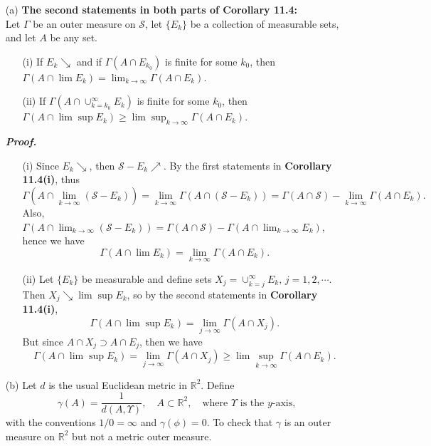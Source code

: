\documentclass[a4paper,11pt]{article}
\begin{document}
	\begin{enumerate}
		\item[(a)]
			\textbf{The second statements in both parts of Corollary 11.4:}\\
			Let $\Gamma$ be an outer measure on $\mathscr{S}$, let $\{E_k\}$ be a collection of measurable sets, and let $A$ be any set.
			\begin{enumerate}
				\item[(i)] If $E_k \searrow$ and if $\Gamma(A \cap E_{k_0})$ is finite for some $k_0$, then $\Gamma(A \cap \lim E_k) = \lim_{k \to \infty} \Gamma(A \cap E_k)$.\

				\item[(ii)] If $\Gamma(A \cap \cup_{k=k_0}^\infty E_k)$ is finite for some $k_0$, then $\Gamma(A \cap \lim \sup E_k) \geq \lim \sup_{k \to \infty} \Gamma(A \cap E_k)$.
			\end{enumerate}
			\textit{\textbf {Proof.}}
			\begin{enumerate}
				\item[(i)]
					Since $E_k \searrow$, then $\mathscr{S} - E_k \nearrow$. By the first statements in \textbf{Corollary 11.4(i)}, thus
						$$\Gamma(A \cap \lim_{k \to \infty} (\mathscr{S} - E_k))
						= \lim_{k \to \infty} \Gamma(A \cap (\mathscr{S} - E_k))
						= \Gamma(A \cap \mathscr{S}) - \lim_{k \to \infty} \Gamma(A \cap E_k).$$
					Also, $\Gamma(A \cap \lim_{k \to \infty} (\mathscr{S} - E_k)) = \Gamma(A \cap \mathscr{S}) - \Gamma(A \cap \lim_{k \to \infty}E_k)$, hence we have
						$$\Gamma(A \cap \lim E_k)
						= \lim_{k \to \infty} \Gamma(A \cap E_k).$$

				\item[(ii)]
					Let $\{E_k\}$ be measurable and define sets $X_j = \cup_{k=j}^\infty E_k,\, j = 1,2,\cdots$. Then $X_j \searrow \lim \sup E_k$, so by the second statements in \textbf{Corollary 11.4(i)},
						$$\Gamma(A \cap \lim \sup E_k)
						= \lim_{j \to \infty} \Gamma(A \cap X_j).$$
					But since $A \cap X_j \supset A \cap E_j$, then we have
						$$\Gamma(A \cap \lim \sup E_k)
						= \lim_{j \to \infty} \Gamma(A \cap X_j)
						\geq \lim \sup_{k \to \infty} \Gamma(A \cap E_k).$$
			\end{enumerate}



		\item[(b)]
			Let $d$ is the usual Euclidean metric in $\mathbb{R}^2$. Define
				$$\gamma(A) = \frac{1}{d(A,\Upsilon)},
				\quad A \subset \mathbb{R}^2,
				\quad \text{where $\Upsilon$ is the $y$-axis,}$$
			with the conventions $1/0 = \infty$ and $\gamma(\phi) = 0$. To check that $\gamma$ is an outer measure on $\mathbb{R}^2$ but not a metric outer measure.\\


\end{enumerate}
\end{document}
